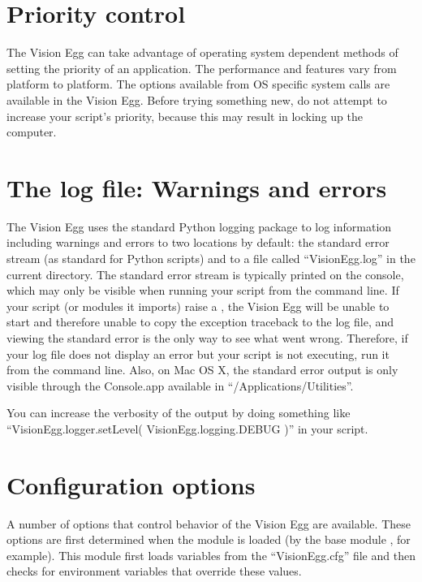 \documentclass{manual}
\begin{document}
\section{Priority control}

The Vision Egg can take advantage of operating system dependent
methods of setting the priority of an application.  The performance
and features vary from platform to platform.  The options available
from OS specific system calls are available in the Vision Egg.  Before
trying something new, do not attempt to increase your script's
priority, because this may result in locking up the computer.

\section{The log file: Warnings and errors}

The Vision Egg uses the standard Python logging package to log
information including warnings and errors to two locations by default:
the standard error stream (as standard for Python scripts) and to a
file called ``VisionEgg.log'' in the current directory.  The standard
error stream is typically printed on the console, which may only be
visible when running your script from the command line.  If your
script (or modules it imports) raise a
, the Vision Egg will be unable to start and
therefore unable to copy the exception traceback to the log file, and
viewing the standard error is the only way to see what went wrong.
Therefore, if your log file does not display an error but your script
is not executing, run it from the command line.  Also, on Mac OS X,
the standard error output is only visible through the Console.app
available in ``/Applications/Utilities''.

You can increase the verbosity of the output by doing something like
``VisionEgg.logger.setLevel( VisionEgg.logging.DEBUG )'' in your
script.

\section{Configuration options}

A number of options that control behavior of the Vision Egg are
available.  These options are first determined when the
 module is loaded (by the base module
, for example).  This module first loads variables
from the ``VisionEgg.cfg'' file and then checks for environment
variables that override these values.
\end{document}
